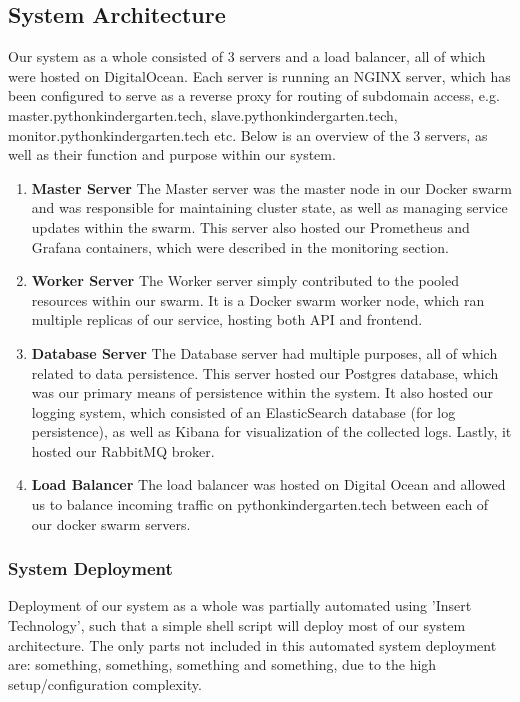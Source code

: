   \subsection{System Architecture}
  Our system as a whole consisted of 3 servers and a load balancer, all of which were hosted on DigitalOcean.
  Each server is running an NGINX server, which has been configured to serve as a reverse proxy for routing of subdomain access, e.g. master.pythonkindergarten.tech, slave.pythonkindergarten.tech, monitor.pythonkindergarten.tech etc.
  \newline
  Below is an overview of the 3 servers, as well as their function and purpose within our system.\newline
  
  \begin{enumerate}
    \item \textbf{Master Server}\newline
    The Master server was the master node in our Docker swarm and was responsible for maintaining cluster state, as well as managing service updates within the swarm.
    This server also hosted our Prometheus and Grafana containers, which were described in the monitoring section.
    \item \textbf{Worker Server}\newline
    The Worker server simply contributed to the pooled resources within our swarm. 
    It is a Docker swarm worker node, which ran multiple replicas of our service, hosting both API and frontend.

    \item \textbf{Database Server}\newline
    The Database server had multiple purposes, all of which related to data persistence.
    This server hosted our Postgres database, which was our primary means of persistence within the system. 
    \newline
    It also hosted our logging system, which consisted of an ElasticSearch database (for log persistence), as well as Kibana for visualization of the collected logs.
    \newline
    Lastly, it hosted our RabbitMQ broker.
    \item \textbf{Load Balancer}\newline
    The load balancer was hosted on Digital Ocean and allowed us to balance incoming traffic on pythonkindergarten.tech between each of our docker swarm servers.
  \end{enumerate}
  \subsubsection{System Deployment}
  Deployment of our system as a whole was partially automated using 'Insert Technology', such that a simple shell script will deploy most of our system architecture.
  The only parts not included in this automated system deployment are: something, something, something and something, due to the high setup/configuration complexity.

